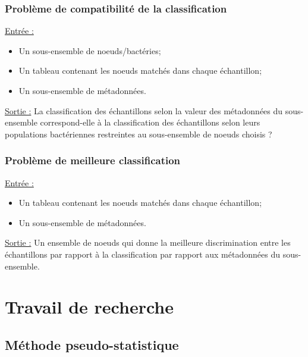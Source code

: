 \documentclass{beamer}
\begin{document}
\begin{frame}
\frametitle{Problème de compatibilité de la classification}

\uline{Entrée :} \begin{itemize} \item Un sous-ensemble de noeuds/bactéries; \item Un tableau contenant les noeuds matchés dans chaque échantillon; \item Un sous-ensemble de métadonnées. \end{itemize}

\bigskip
\uline{Sortie :} La classification des échantillons selon la valeur des métadonnées du sous-ensemble correspond-elle à la classification des échantillons selon leurs populations bactériennes restreintes au sous-ensemble de noeuds choisis ?

\end{frame}

\begin{frame}
\frametitle{Problème de meilleure classification}

\uline{Entrée :} \begin{itemize} \item Un tableau contenant les noeuds matchés dans chaque échantillon; \item Un sous-ensemble de métadonnées. \end{itemize}

\bigskip
\uline{Sortie :} Un ensemble de noeuds qui donne la meilleure discrimination entre les échantillons par rapport à la classification par rapport aux métadonnées du sous-ensemble.

\end{frame}

\section{Travail de recherche}


\subsection{Méthode pseudo-statistique}

\end{document}
